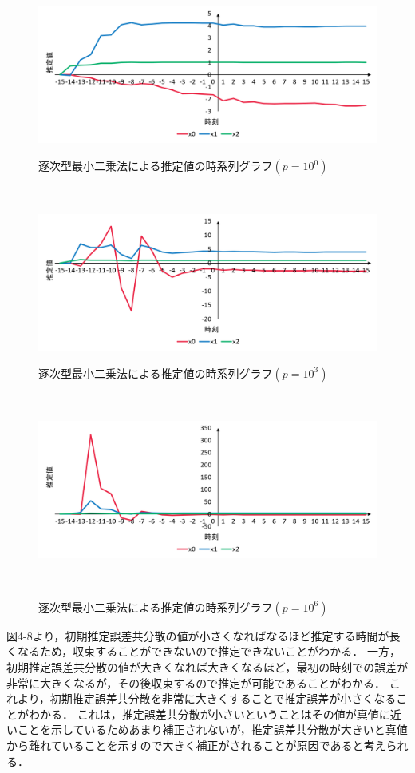 \documentclass[a4paper]{jarticle}
\begin{document}
\begin{figure}[!h]
  \centering
  \includegraphics[width=16cm]{Seq0.png}
  \caption{逐次型最小二乗法による推定値の時系列グラフ\( (p=10^{0}) \)}
　\label{graph}

  \centering
  \includegraphics[width=16cm]{Seq3.png}
  \caption{逐次型最小二乗法による推定値の時系列グラフ\( (p=10^{3}) \)}
　\label{graph}

  \centering
  \includegraphics[width=16cm]{Seq6.png}
  \caption{逐次型最小二乗法による推定値の時系列グラフ\( (p=10^{6}) \)}
　\label{graph}
\end{figure}

図4-8より，初期推定誤差共分散の値が小さくなればなるほど推定する時間が長くなるため，収束することができないので推定できないことがわかる．
一方，初期推定誤差共分散の値が大きくなれば大きくなるほど，最初の時刻での誤差が非常に大きくなるが，その後収束するので推定が可能であることがわかる．
これより，初期推定誤差共分散を非常に大きくすることで推定誤差が小さくなることがわかる．
これは，推定誤差共分散が小さいということはその値が真値に近いことを示しているためあまり補正されないが，推定誤差共分散が大きいと真値から離れていることを示すので大きく補正がされることが原因であると考えられる．
\end{document}
